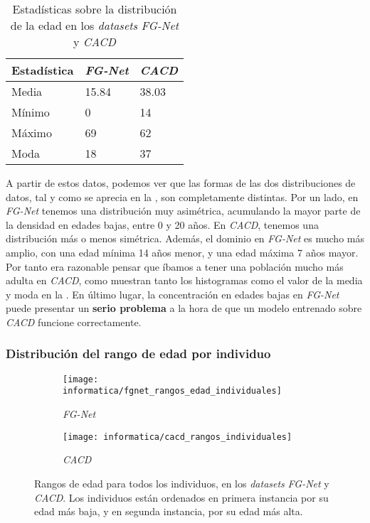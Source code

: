 \begin{table}[!hbtp]
\centering
\begin{tabular}{|l|l|l|}
    \hline
    \textbf{Estadística} & \textbf{\textit{FG-Net}} & \textbf{\textit{CACD}} \\
    \hline

    Media  & 15.84 & 38.03 \\
    Mínimo & 0     & 14    \\
    Máximo & 69    & 62    \\
    Moda   & 18    & 37    \\

    \hline

\end{tabular}
    \caption{Estadísticas sobre la distribución de la edad en los \textit{datasets} \textit{FG-Net} y \textit{CACD}}
    \label{table:conjunta_fgnet_cacd_estadisticas_edad}
\end{table}

A partir de estos datos, podemos ver que las formas de las dos distribuciones de datos, tal y como se aprecia en la , son completamente distintas. Por un lado, en \textit{FG-Net} tenemos una distribución muy asimétrica, acumulando la mayor parte de la densidad en edades bajas, entre 0 y 20 años. En \textit{CACD}, tenemos una distribución más o menos simétrica. Además, el dominio en \textit{FG-Net} es mucho más amplio, con una edad mínima 14 años menor, y una edad máxima 7 años mayor. Por tanto era razonable pensar que íbamos a tener una población mucho más adulta en \textit{CACD}, como muestran tanto los histogramas como el valor de la media y moda en la . En último lugar, la concentración en edades bajas en \textit{FG-Net} puede presentar un \textbf{serio problema} a la hora de que un modelo entrenado sobre \textit{CACD} funcione correctamente.

\subsubsection{Distribución del rango de edad por individuo}

\begin{figure}[!h]
    \centering
    \begin{subfigure}[t]{0.55\textwidth}
        \centering
        \texttt{[image: informatica/fgnet\_rangos\_edad\_individuales]}
        \caption{\textit{FG-Net}}
    \end{subfigure}
    \begin{subfigure}[t]{0.4\textwidth}
        \centering
        \texttt{[image: informatica/cacd\_rangos\_individuales]}
        \caption{\textit{CACD}}
    \end{subfigure}

    \caption{Rangos de edad para todos los individuos, en los \textit{datasets} \textit{FG-Net} y \textit{CACD}. Los individuos están ordenados en primera instancia por su edad más baja, y en segunda instancia, por su edad más alta.}
    \label{img:conjunta_fgnet_rangos_edades_individuales}
\end{figure}


